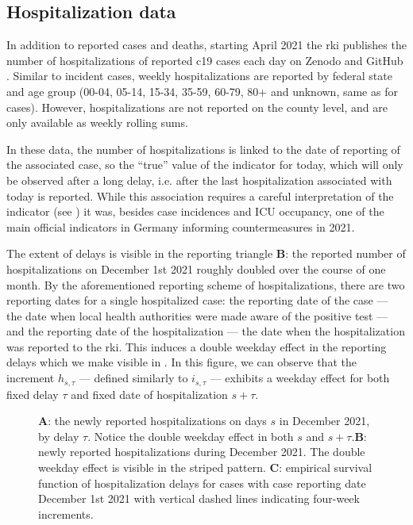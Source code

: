 \subsection{Hospitalization data}
In addition to reported cases and deaths, starting  April 2021 the \acrshort{rki} publishes the number of hospitalizations of reported \acrshort{c19} cases each day on Zenodo \citep{RobertKoch-Institut2024COVID19Hospitalisierungen} and GitHub \citep{RobertKoch-Institut2024COVID19Hospitalisierungena}. 
Similar to incident cases, weekly hospitalizations are reported by federal state and age group (00-04, 05-14, 15-34, 35-59, 60-79, 80+ and unknown, same as for cases). However, hospitalizations are not reported on the county level, and are only available as weekly rolling sums.

In these data, the number of hospitalizations is linked to the date of reporting of the associated case, so the ``true'' value of the indicator for today, which will only be observed after a long delay, i.e. after the last hospitalization associated with today is reported. While this association requires a careful interpretation of the indicator (see ) it was, besides case incidences and ICU occupancy, one of the main official indicators in Germany informing countermeasures in 2021.

The extent of delays is visible in the reporting triangle  \textbf{B}: the reported number of hospitalizations on December 1st 2021 roughly doubled over the course of one month. By the aforementioned reporting scheme of hospitalizations, there are two reporting dates for a single hospitalized case: the reporting date of the case --- the date when local health authorities were made aware of the positive test --- and the reporting date of the hospitalization --- the date when the hospitalization was reported to the \acrshort{rki}. This induces a double weekday effect in the reporting delays which we make visible in . 
In this figure, we can observe that the increment $h_{s,\tau}$ --- defined similarly to $i_{s,\tau}$ --- exhibits a weekday effect for both fixed delay $\tau$ and fixed date of hospitalization
$s + \tau$. 

\begin{figure}
    \resizebox{\textwidth}{!}{%
    }
    \caption{\textbf{A}: the newly reported hospitalizations on days $s$ in December 2021, by delay $\tau$. Notice the double weekday effect in both $s$ and $s+\tau$.\textbf{B}: newly reported hospitalizations during December 2021. The double weekday effect is visible in the striped pattern. \textbf{C}: empirical survival function of hospitalization delays for cases with case reporting date December 1st 2021 with vertical dashed lines indicating four-week increments.}
    \label{fig:double_weekday_effect_hosp}
\end{figure}

